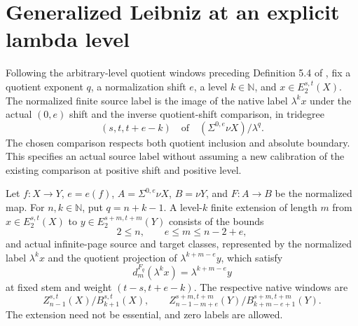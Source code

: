 \section{Generalized Leibniz at an explicit lambda level}

\begin{definition}
\label{sem:ProofTools:level-source-label}
Following the arbitrary-level quotient windows preceding Definition 5.4 of \cite{LWX126}, fix a quotient exponent $q$, a normalization shift $e$, a level $k\in\mathbb N$, and $x\in E_2^{s,t}(X)$. The normalized finite source label is the image of the native label $\lambda^k x$ under the actual $(0,e)$ shift and the inverse quotient-shift comparison, in tridegree
\[(s,t,t+e-k)\quad\text{of}\quad (\Sigma^{0,e}\nu X)/\lambda^q.\]
The chosen comparison respects both quotient inclusion and absolute boundary. This specifies an actual source label without assuming a new calibration of the existing comparison at positive shift and positive level.
\end{definition}

\begin{definition}
\label{sem:ProofTools:level-finite-extension}
Let $f:X\to Y$, $e=e(f)$, $A=\Sigma^{0,e}\nu X$, $B=\nu Y$, and $F:A\to B$ be the normalized map. For $n,k\in\mathbb N$, put $q=n+k-1$. A level-$k$ finite extension of length $m$ from $x\in E_2^{s,t}(X)$ to $y\in E_2^{s+m,t+m}(Y)$ consists of the bounds
\[2\le n,\qquad e\le m\le n-2+e,\]
and actual infinite-page source and target classes, represented by the normalized label $\lambda^k x$ and the quotient projection of $\lambda^{k+m-e}y$, which satisfy
\[d_m^{F_q}(\lambda^k x)=\lambda^{k+m-e}y\]
at fixed stem and weight $(t-s,t+e-k)$. The respective native windows are
\[Z_{n-1}^{s,t}(X)/B_{k+1}^{s,t}(X),\qquad
Z_{n-1-m+e}^{s+m,t+m}(Y)/B_{k+m-e+1}^{s+m,t+m}(Y).\]
The extension need not be essential, and zero labels are allowed.
\end{definition}

